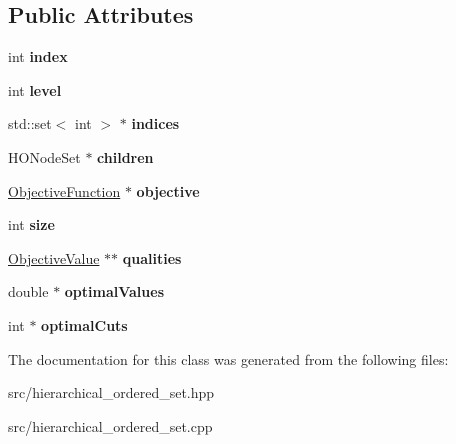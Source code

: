\subsection*{Public Attributes}
\begin{DoxyCompactItemize}
\item 
\hypertarget{classHONode_afdceeb6b9dd641633be6b81380b9bb0f}{int {\bfseries index}}\label{classHONode_afdceeb6b9dd641633be6b81380b9bb0f}

\item 
\hypertarget{classHONode_ae8d4dd48892372be94f6e214450c5e44}{int {\bfseries level}}\label{classHONode_ae8d4dd48892372be94f6e214450c5e44}

\item 
\hypertarget{classHONode_a8d093f3290293ea7b7e03a185798fe64}{std\-::set$<$ int $>$ $\ast$ {\bfseries indices}}\label{classHONode_a8d093f3290293ea7b7e03a185798fe64}

\item 
\hypertarget{classHONode_a1c4e4ef9ffa03161b427606cd6255b52}{H\-O\-Node\-Set $\ast$ {\bfseries children}}\label{classHONode_a1c4e4ef9ffa03161b427606cd6255b52}

\item 
\hypertarget{classHONode_a3fd5dd67e556117b39d50412718f47e4}{\hyperlink{classObjectiveFunction}{Objective\-Function} $\ast$ {\bfseries objective}}\label{classHONode_a3fd5dd67e556117b39d50412718f47e4}

\item 
\hypertarget{classHONode_ad63d56300726c5d89d11276ab1c3fdec}{int {\bfseries size}}\label{classHONode_ad63d56300726c5d89d11276ab1c3fdec}

\item 
\hypertarget{classHONode_acf196983ba89362f7509dbf1758513d3}{\hyperlink{classObjectiveValue}{Objective\-Value} $\ast$$\ast$ {\bfseries qualities}}\label{classHONode_acf196983ba89362f7509dbf1758513d3}

\item 
\hypertarget{classHONode_af9e4cf35f08fe3c9d4ec44cabc1d439d}{double $\ast$ {\bfseries optimal\-Values}}\label{classHONode_af9e4cf35f08fe3c9d4ec44cabc1d439d}

\item 
\hypertarget{classHONode_ac2b2e15ed1a6893c073d2551c735b2d2}{int $\ast$ {\bfseries optimal\-Cuts}}\label{classHONode_ac2b2e15ed1a6893c073d2551c735b2d2}

\end{DoxyCompactItemize}


The documentation for this class was generated from the following files\-:\begin{DoxyCompactItemize}
\item 
src/hierarchical\-\_\-ordered\-\_\-set.\-hpp\item 
src/hierarchical\-\_\-ordered\-\_\-set.\-cpp\end{DoxyCompactItemize}
